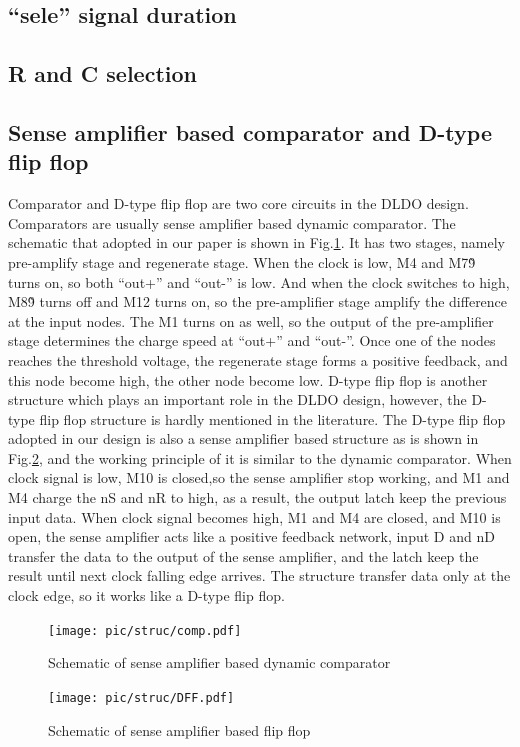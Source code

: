 \documentclass[journal]{IEEEtran}
\begin{document}
\subsection{``sele'' signal duration}
\subsection{R and C selection}
\subsection{Sense amplifier based comparator and D-type flip flop}
Comparator and D-type flip flop are two core circuits in the DLDO design. Comparators are usually sense amplifier based dynamic comparator. The schematic that adopted in our paper is shown in Fig.\ref{fig:comp}. It has two stages, namely pre-amplify stage and regenerate stage. When the clock is low, M4 and M7\~9 turns on, so both ``out+'' and ``out-'' is low. And when the clock switches to high, M8\~9 turns off and M12 turns on, so the pre-amplifier stage amplify the difference at the input nodes. The M1 turns on as well, so the output of the pre-amplifier stage determines the charge speed at ``out+'' and ``out-''. Once one of the nodes reaches the threshold voltage, the regenerate stage forms a positive feedback, and this node become high, the other node become low. D-type flip flop is another structure which plays an important role in the DLDO design, however, the D-type flip flop structure is hardly mentioned in the literature. The D-type flip flop adopted in our design is also a sense amplifier based structure as is shown in Fig.\ref{fig:DFF}, and the working principle of it is similar to the dynamic comparator.  When clock signal is low, M10 is closed,so the sense amplifier stop working, and M1 and M4 charge the nS and nR to high, as a result, the output latch keep the previous input data. When clock signal becomes high, M1 and M4 are closed, and M10 is open, the sense amplifier acts like a positive feedback network, input D and nD transfer the data to the output of the sense amplifier, and the latch keep the result until next clock falling edge arrives. The structure transfer data only at the clock edge, so it works like a D-type flip flop.
\begin{figure}[t!]
    \centering
    \texttt{[image: pic/struc/comp.pdf]}
    \caption{Schematic of sense amplifier based dynamic comparator}
    \label{fig:comp}
\end{figure}
\begin{figure}[t!]
    \centering
    \texttt{[image: pic/struc/DFF.pdf]}
    \caption{Schematic of sense amplifier based flip flop}
    \label{fig:DFF}
\end{figure}
\end{document}
